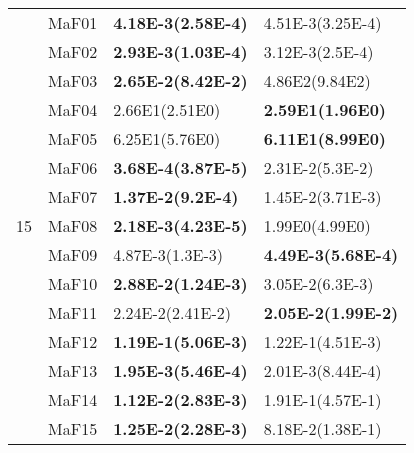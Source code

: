 \documentclass[]{article}
\begin{document}
\begin{table}
\begin{footnotesize}
\begin{tabular}{|l|l|l|l|}
\multirow{15}{*}{15} & MaF01 & \cellcolor{gray95} {\bf 4.18E-3(2.58E-4)} & 4.51E-3(3.25E-4)\\
 & MaF02 & \cellcolor{gray95} {\bf 2.93E-3(1.03E-4)} & 3.12E-3(2.5E-4)\\
 & MaF03 & \cellcolor{gray95} {\bf 2.65E-2(8.42E-2)} & \cellcolor{gray95} 4.86E2(9.84E2)\\
 & MaF04 & \cellcolor{gray95} 2.66E1(2.51E0) & \cellcolor{gray95} {\bf 2.59E1(1.96E0)}\\
 & MaF05 & \cellcolor{gray95} 6.25E1(5.76E0) & \cellcolor{gray95} {\bf 6.11E1(8.99E0)}\\
 & MaF06 & \cellcolor{gray95} {\bf 3.68E-4(3.87E-5)} & \cellcolor{gray95} 2.31E-2(5.3E-2)\\
 & MaF07 & \cellcolor{gray95} {\bf 1.37E-2(9.2E-4)} & \cellcolor{gray95} 1.45E-2(3.71E-3)\\
 & MaF08 & \cellcolor{gray95} {\bf 2.18E-3(4.23E-5)} & \cellcolor{gray95} 1.99E0(4.99E0)\\
 & MaF09 & \cellcolor{gray95} 4.87E-3(1.3E-3) & \cellcolor{gray95} {\bf 4.49E-3(5.68E-4)}\\
 & MaF10 & \cellcolor{gray95} {\bf 2.88E-2(1.24E-3)} & \cellcolor{gray95} 3.05E-2(6.3E-3)\\
 & MaF11 & \cellcolor{gray95} 2.24E-2(2.41E-2) & \cellcolor{gray95} {\bf 2.05E-2(1.99E-2)}\\
 & MaF12 & \cellcolor{gray95} {\bf 1.19E-1(5.06E-3)} & 1.22E-1(4.51E-3)\\
 & MaF13 & \cellcolor{gray95} {\bf 1.95E-3(5.46E-4)} & \cellcolor{gray95} 2.01E-3(8.44E-4)\\
 & MaF14 & \cellcolor{gray95} {\bf 1.12E-2(2.83E-3)} & \cellcolor{gray95} 1.91E-1(4.57E-1)\\
 & MaF15 & \cellcolor{gray95} {\bf 1.25E-2(2.28E-3)} & 8.18E-2(1.38E-1)\\
\hline
\end{tabular}
\end{footnotesize}
\end{table}
\end{document}
